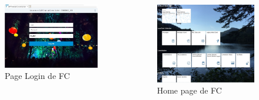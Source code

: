 \documentclass{beamer}
\begin{document}
        \begin{frame}
            \begin{columns}
                \begin{figure}
                    \centering
                    \includegraphics[width=\textwidth]{FC_pageLogin.JPG}
                    \caption{Page Login de FC}
                    \label{fig:FC_login_label}
                \end{figure}
                
                \begin{figure}
                    \centering
                    \includegraphics[width=\textwidth]{FC_Homepage.JPG}
                    \caption{Home page de FC}
                    \label{fig:FC_homepage_label}
                \end{figure}
            \end{columns}
            
        \end{frame}
        
\end{document}
